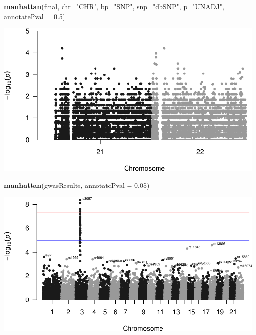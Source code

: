 \documentclass[
]{article}
\newenvironment{Shaded}{\begin{snugshade}}{\end{snugshade}}
\newcommand{\DataTypeTok}[1]{\textcolor[rgb]{0.13,0.29,0.53}{#1}}
\newcommand{\FloatTok}[1]{\textcolor[rgb]{0.00,0.00,0.81}{#1}}
\newcommand{\KeywordTok}[1]{\textcolor[rgb]{0.13,0.29,0.53}{\textbf{#1}}}
\newcommand{\NormalTok}[1]{#1}
\newcommand{\StringTok}[1]{\textcolor[rgb]{0.31,0.60,0.02}{#1}}
\begin{document}
\begin{Shaded}
\begin{Highlighting}[]
\KeywordTok{manhattan}\NormalTok{(final,  }\DataTypeTok{chr=}\StringTok{"CHR"}\NormalTok{, }\DataTypeTok{bp=}\StringTok{"SNP"}\NormalTok{, }\DataTypeTok{snp=}\StringTok{"dbSNP"}\NormalTok{, }\DataTypeTok{p=}\StringTok{"UNADJ"}\NormalTok{, }\DataTypeTok{annotatePval =} \FloatTok{0.5}\NormalTok{)}
\end{Highlighting}
\end{Shaded}

\includegraphics{GWASvisualizations_files/figure-latex/unnamed-chunk-12-1.pdf}

\begin{Shaded}
\begin{Highlighting}[]
\KeywordTok{manhattan}\NormalTok{(gwasResults, }\DataTypeTok{annotatePval =} \FloatTok{0.05}\NormalTok{)}
\end{Highlighting}
\end{Shaded}

\includegraphics{GWASvisualizations_files/figure-latex/unnamed-chunk-12-2.pdf}
\end{document}
